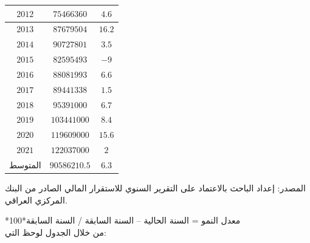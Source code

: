 \documentclass[10pt,a4paper]{report}
\begin{document}
\begin{doublespacing}
\begin{table}[H]
{\begin{tabular}{@{}|c|c|c|@{}}
				$2012$         & $75466360$                                 & $4.6$                \\ \midrule
				$2013$         & $87679504$                                 & $16.2$               \\ \midrule
				$2014$         & $90727801$                                 & $3.5$                \\ \midrule
				$2015$         & $82595493$                                 & $-9$                 \\ \midrule
				$2016$         & $88081993$                                 & $6.6$                \\ \midrule
				$2017$         & $89441338$                                 & $1.5$                \\ \midrule
				$2018$         & $95391000$                                 & $6.7$                \\ \midrule
				$2019$         & $103441000$                                & $8.4$                \\ \midrule
				$2020$         & $119609000$                                & $15.6$               \\ \midrule
				$2021$         & $122037000$                                & $2$                  \\ \midrule
				المتوسط        & $90586210.5$                               & $6.3$                \\ \bottomrule
			\end{tabular}%
		}
	\end{table}
المصدر: إعداد الباحث بالاعتماد على التقرير السنوي للاستقرار المالي الصادر من البنك المركزي العراقي.

*معدل النمو = السنة الحالية – السنة السابقة / السنة السابقة*100\\
من خلال الجدول لوحظ التي:


\end{doublespacing}
\end{document}
